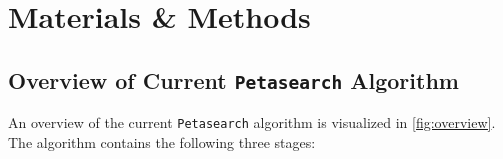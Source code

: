 \chapter{Materials \& Methods} \label{chapter:materials-methods}



\section{Overview of Current \texttt{Petasearch} Algorithm} \label{section:overview-of-current-algorithm}

An overview of the current \texttt{Petasearch} algorithm is visualized in \autoref{fig:overview}.
The algorithm contains the following three stages:

